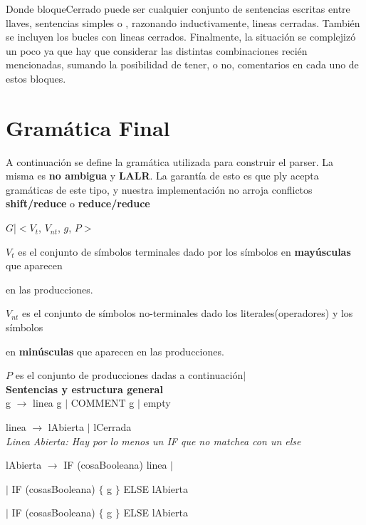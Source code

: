 Donde bloqueCerrado puede ser cualquier conjunto de sentencias escritas entre llaves, sentencias simples o , razonando inductivamente, lineas cerradas. También se incluyen los bucles con lineas cerrados. Finalmente, la situación se complejizó un poco ya que hay que considerar las distintas combinaciones recién mencionadas, sumando la posibilidad de tener, o no, comentarios en cada uno de estos bloques.


\section{Gramática Final}
A continuación se define la gramática utilizada para construir el parser. La misma es \textbf{no ambigua} y \textbf{LALR}. La garantía de esto es que ply acepta gramáticas de este tipo, y nuestra implementación no arroja conflictos \textbf{shift/reduce} o \textbf{reduce/reduce} \\

\linespread{1.125}\selectfont

$G$|$<V_{t}$, $V_{nt}$, $g$, $P>$

$V_{t}$ es el conjunto de símbolos terminales dado por los símbolos en \textbf{mayúsculas} que aparecen 

en las producciones.


$V_{nt}$ es el conjunto de símbolos no-terminales dado los literales(operadores) y los símbolos

en \textbf{minúsculas} que aparecen en las producciones.



$P$ es el conjunto de producciones dadas a continuación$|$\\


\textbf{Sentencias y estructura general} \\

g $\rightarrow$ linea g $|$ COMMENT g $|$ empty 

linea $\rightarrow$ lAbierta $|$ lCerrada \\


\textit{Linea Abierta: Hay por lo menos un IF que no matchea con un else} 

lAbierta $\rightarrow$ IF (cosaBooleana) linea $|$

\hspace{15mm}$|$ IF (cosasBooleana) $\{$ g $\}$ ELSE lAbierta

\hspace{15mm}$|$ IF (cosasBooleana) $\{$ g $\}$ ELSE lAbierta

